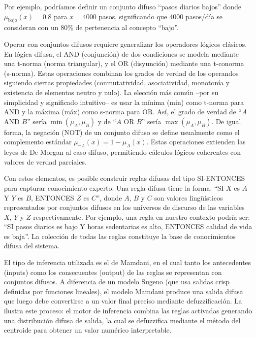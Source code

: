 Por ejemplo, podríamos definir un conjunto difuso ``pasos diarios bajos'' donde $\mu_{\text{bajo}}(x) = 0.8$ para $x = 4000$ pasos, significando que 4000 pasos/día se consideran con un 80\% de pertenencia al concepto ``bajo''.

Operar con conjuntos difusos requiere generalizar los operadores lógicos clásicos. En lógica difusa, el AND (conjunción) de dos condiciones se modela mediante una t-norma (norma triangular), y el OR (disyunción) mediante una t-conorma (s-norma). Estas operaciones combinan los grados de verdad de los operandos siguiendo ciertas propiedades (conmutatividad, asociatividad, monotonía y existencia de elementos neutro y nulo). La elección más común --por su simplicidad y significado intuitivo-- es usar la mínima (min) como t-norma para AND y la máxima (máx) como s-norma para OR. Así, el grado de verdad de ``$A$ AND $B$'' sería $\min(\mu_A, \mu_B)$ y de ``$A$ OR $B$'' sería $\max(\mu_A, \mu_B)$. De igual forma, la negación (NOT) de un conjunto difuso se define usualmente como el complemento estándar $\mu_{\neg A}(x) = 1 - \mu_A(x)$. Estas operaciones extienden las leyes de De Morgan al caso difuso, permitiendo cálculos lógicos coherentes con valores de verdad parciales.

Con estos elementos, es posible construir reglas difusas del tipo SI-ENTONCES para capturar conocimiento experto. Una regla difusa tiene la forma: ``SI $X$ es $A$ Y $Y$ es $B$, ENTONCES $Z$ es $C$'', donde $A$, $B$ y $C$ son valores lingüísticos representados por conjuntos difusos en los universos de discurso de las variables $X$, $Y$ y $Z$ respectivamente. Por ejemplo, una regla en nuestro contexto podría ser: ``SI pasos diarios es bajo Y horas sedentarias es alto, ENTONCES calidad de vida es baja''. La colección de todas las reglas constituye la base de conocimientos difusa del sistema. 

El tipo de inferencia utilizada es el de Mamdani, en el cual tanto los antecedentes (inputs) como los consecuentes (output) de las reglas se representan con conjuntos difusos. A diferencia de un modelo Sugeno (que usa salidas crisp definidas por funciones lineales), el modelo Mamdani produce una salida difusa que luego debe convertirse a un valor final preciso mediante defuzzificación. La  ilustra este proceso: el motor de inferencia combina las reglas activadas generando una distribución difusa de salida, la cual se defuzzifica mediante el método del centroide para obtener un valor numérico interpretable.

